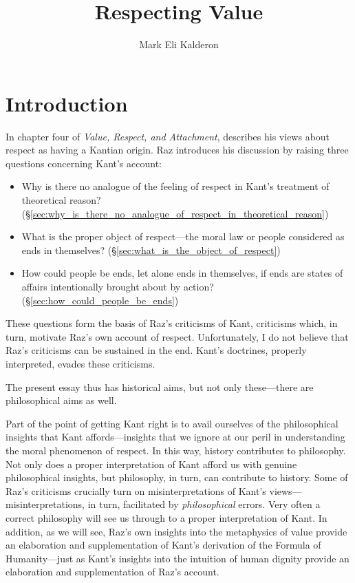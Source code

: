 \documentclass[a4paper,12pt]{article}
\title{Respecting Value} %
\author{Mark Eli Kalderon}
\begin{document}
\maketitle


\section{Introduction} \label{sec:introduction} %

In chapter four of \emph{Value, Respect, and Attachment}, \cite{Raz:2001ps} describes his views about respect as having a Kantian origin. Raz introduces his discussion by raising three questions concerning Kant's account: 
\begin{itemize}
	\item Why is there no analogue of the feeling of respect in Kant's treatment of theoretical reason? (\S\ref{sec:why_is_there_no_analogue_of_respect_in_theoretical_reason}) 
	\item What is the proper object of respect---the moral law or people considered as ends in themselves? (\S\ref{sec:what_is_the_object_of_respect}) 
	\item How could people be ends, let alone ends in themselves, if ends are states of affairs intentionally brought about by action? (\S\ref{sec:how_could_people_be_ends}) 
\end{itemize}
These questions form the basis of Raz's criticisms of Kant, criticisms which, in turn, motivate Raz's own account of respect. Unfortunately, I do not believe that Raz's criticisms can be sustained in the end. Kant's doctrines, properly interpreted, evades these criticisms. 

The present essay thus has historical aims, but not only these---there are  philosophical aims as well. 

Part of the point of getting Kant right is to avail ourselves of the philosophical insights that Kant affords---insights that we ignore at our peril in understanding the moral phenomenon of respect. In this way, history contributes to philosophy. Not only does a proper interpretation of Kant afford us with genuine philosophical insights, but philosophy, in turn, can contribute to history. Some of Raz's criticisms crucially turn on misinterpretations of Kant's views---misinterpretations, in turn, facilitated by \emph{philosophical} errors. Very often a correct philosophy will see us through to a proper interpretation of Kant. In addition, as we will see, Raz's own insights into the metaphysics of value provide an elaboration and supplementation of Kant's derivation of the Formula of Humanity---just as Kant's insights into the intuition of human dignity provide an elaboration and supplementation of Raz's account.
\end{document}
